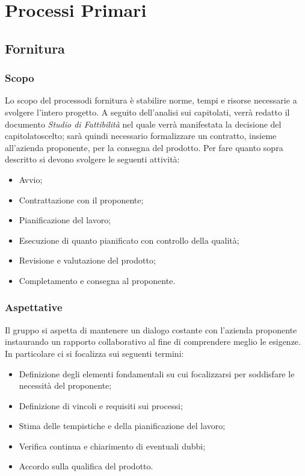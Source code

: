 \section{Processi Primari}
\subsection{Fornitura}
\subsubsection{Scopo}
Lo scopo del processo\glosp di fornitura è stabilire norme, tempi e risorse necessarie a svolgere l'intero progetto\glo.
A seguito dell'analisi sui capitolati\glo, verrà redatto il documento \textit{Studio di Fattibilità} nel quale verrà manifestata la decisione del capitolato\glosp scelto; sarà quindi necessario formalizzare un contratto, insieme all'azienda proponente, per la consegna del prodotto. 
Per fare quanto sopra descritto si devono svolgere le seguenti attività:
\begin{itemize}
	\item Avvio;
	\item Contrattazione con il proponente;
	\item Pianificazione del lavoro;
	\item Esecuzione di quanto pianificato con controllo della qualità;
	\item Revisione e valutazione del prodotto;
	\item Completamento e consegna al proponente.
\end{itemize}
\subsubsection{Aspettative}
Il gruppo si aspetta di mantenere un dialogo costante con l'azienda proponente instaurando un rapporto collaborativo al fine di comprendere meglio le esigenze. In particolare ci si focalizza sui seguenti termini:
\begin{itemize}
	\item Definizione degli elementi fondamentali su cui focalizzarsi per soddisfare le necessità del proponente;
	\item Definizione di vincoli e requisiti sui processi;
	\item Stima delle tempistiche e della pianificazione del lavoro;
	\item Verifica continua e chiarimento di eventuali dubbi;
	\item Accordo sulla qualifica del prodotto.
\end{itemize} 
